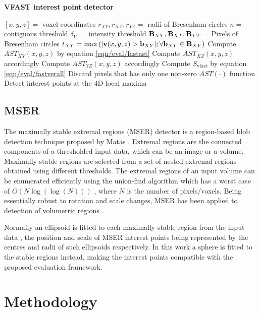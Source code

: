 \begin{algorithm}
\caption{\textbf{VFAST interest point detector}}
\label{algo/eval/vfast}
\begin{algorithmic}
	\REQUIRE $[x,y,z] = $ voxel coordinates
	\REQUIRE $r_{XY},r_{XZ},r_{YZ} = $ radii of Bresenham circles
	\REQUIRE $n = $ contiguous threshold
	\REQUIRE $\delta_{V} = $ intensity threshold
	\STATE $\mathbf{B}_{XY},\mathbf{B}_{XT},\mathbf{B}_{YT}$ = Pixels of Bresenham circles
	\STATE $t_{XY} = \max\left(| \mathbf{v}(x,y,z) > \mathbf{b}_{XY}|; \forall \mathbf{b}_{XY} \in \mathbf{B}_{XY} \right)$
	\STATE Compute $AST_{XY}(x,y,z)$ by equation \ref{eqn/eval/fastast}
	\STATE Compute $AST_{XZ}(x,y,z)$ accordingly 
	\STATE Compute $AST_{YZ}(x,y,z)$ accordingly 
	\STATE Compute $S_\textrm{vfast}$ by equation \ref{eqn/eval/fastverall}
	\STATE Discard pixels that has only one non-zero $AST(\cdot)$ function 
	\STATE Detect interest points at the 4D local maxima 
\end{algorithmic}
\end{algorithm}

\subsection{MSER}
The maximally stable extremal regions (MSER) detector is a region-based blob detection technique proposed by Matas \etal \cite{Matas2004}. Extremal regions are the connected components of a thresholded input data, which can be an image or a volume. Maximally stable regions are selected from a set of nested extremal regions obtained using different thresholds. The extremal regions of an input volume can be enumerated efficiently using the union-find algorithm which has a worst case of $O(N\log(\log(N)))$ \cite{Matas2004}, where $N$ is the number of pixels/voxels. 
Being essentially robust to rotation and scale changes, MSER has been applied to detection of volumetric regions \cite{Donoser2006,Riemenschneider2009}.

Normally an ellipsoid is fitted to each maximally stable region from the input data \cite{Matas2004}, the position and scale of MSER interest points being represented by the centres and radii of such ellipsoids respectively. In this work a sphere is fitted to the stable regions instead, making the interest points compatible with the proposed evaluation framework.

\section{Methodology}
\label{sec/eval/methodology}

